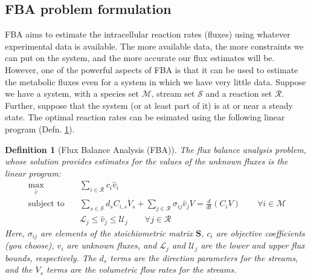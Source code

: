 \documentclass{article}[11pt]
\newtheorem{defn}{Definition}
\begin{document}
\subsection{FBA problem formulation}
FBA aims to estimate the intracellular reaction rates (fluxes) using whatever experimental data is available.
The more available data, the more constraints we can put on the system, and the more accurate our flux estimates will be.
However, one of the powerful aspects of FBA is that it can be used to estimate the metabolic fluxes even for a system in which we have very little data.
Suppose we have a system, with a species set $\mathcal{M}$, stream set $\mathcal{S}$ and a reaction set $\mathcal{R}$. 
Further, suppose that the system (or at least part of it) is at or near a steady state. 
The optimal reaction rates can be esimated using the following linear program (Defn. \ref{defn-fba-concentration}).

\begin{mdframed}
\begin{defn}[Flux Balance Analysis (FBA)]\label{defn-fba-concentration}
The flux balance analysis problem, whose solution provides estimates for the values of the unknown fluxes is the linear program: 
\begin{align*}
\max_{\hat{v}}\quad&  \sum_{i\in\mathcal{R}}c_{i}\hat{v}_{i}\\
\text{subject to}\quad & \sum_{s\in\mathcal{S}}d_{s}C_{i,s}\dot{V}_{s} + \sum_{j\in\mathcal{R}}\sigma_{ij}\hat{v}_{j}V = \frac{d}{dt}\left(C_{i}V\right)\qquad\forall{i\in\mathcal{M}}\\
& \mathcal{L}_{j}\leq\hat{v}_{j}\leq\mathcal{U}_{j}\qquad\forall{j\in\mathcal{R}}
\end{align*}
Here, $\sigma_{ij}$ are elements of the stoichiometric matrix $\mathbf{S}$, $c_{i}$ are objective coefficients (you choose), $\hat{v}_{i}$ are unknown fluxes, and $\mathcal{L}_{j}$ and $\mathcal{U}_{j}$ are the lower and upper flux bounds, respectively.
The $d_{s}$ terms are the direction parameters for the streams, and the $\dot{V}_{s}$ terms are the volumetric flow rates for the streams. 
\end{defn}
\end{mdframed}


\end{document}
